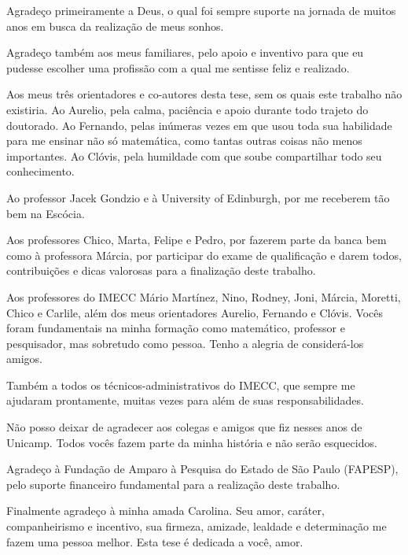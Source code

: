

Agradeço primeiramente a Deus, o qual foi sempre suporte na jornada de muitos anos em busca da realização de meus sonhos.

Agradeço também aos meus familiares, pelo apoio  e  inventivo para que eu pudesse escolher uma profissão com a qual me sentisse feliz e realizado.

Aos meus três orientadores e co-autores desta tese, sem os quais este trabalho não existiria. Ao Aurelio, pela calma, paciência e apoio durante todo trajeto do doutorado. Ao Fernando, pelas inúmeras vezes em que usou toda sua habilidade para me ensinar não só matemática, como  tantas outras  coisas não menos importantes. Ao Clóvis, pela humildade com que soube compartilhar todo seu conhecimento. 

Ao professor Jacek Gondzio e à University of Edinburgh, por me receberem tão bem na Escócia.


Aos professores Chico, Marta, Felipe e Pedro, por fazerem parte da banca bem como à professora Márcia, por participar do exame de qualificação e darem todos, contribuições e dicas valorosas para a finalização deste trabalho.

Aos professores do IMECC Mário Martínez, Nino, Rodney, Joni, Márcia, Moretti, Chico e Carlile,  além dos meus orientadores Aurelio, Fernando e Clóvis. Vocês foram fundamentais na minha formação como  matemático, professor e  pesquisador,  mas sobretudo como pessoa. Tenho a alegria de considerá-los amigos.  

Também a todos os técnicos-administrativos do IMECC, que  sempre me ajudaram prontamente, muitas vezes para além de suas responsabilidades.

Não posso deixar de agradecer aos  colegas e amigos que fiz nesses  anos de Unicamp. Todos vocês fazem parte da minha história e não serão esquecidos.

Agradeço  à Fundação de Amparo à Pesquisa do Estado de São Paulo (FAPESP), pelo suporte financeiro fundamental para a realização deste trabalho.

Finalmente agradeço à minha amada Carolina. Seu amor, caráter, companheirismo e incentivo, sua firmeza, amizade, lealdade e determinação me fazem uma pessoa melhor. Esta tese é dedicada a você, amor.

